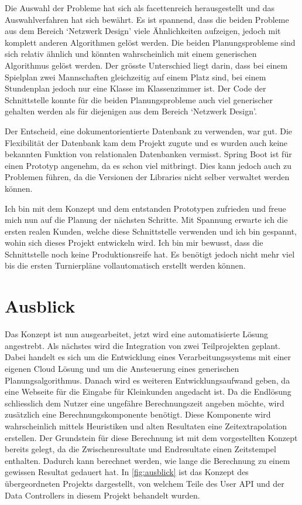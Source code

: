 Die Auswahl der Probleme hat sich als facettenreich herausgestellt und das Auswahlverfahren hat sich bewährt. Es ist spannend, dass die beiden Probleme aus dem Bereich `Netzwerk Design' 
viele Ähnlichkeiten aufzeigen, jedoch mit komplett anderen Algorithmen gelöst werden. Die beiden Planungsprobleme sind sich relativ ähnlich und könnten wahrscheinlich mit einem generischen 
Algorithmus gelöst werden. Der grösste Unterschied liegt darin, dass bei einem Spielplan zwei Mannschaften gleichzeitig auf einem Platz sind, bei einem 
Stundenplan jedoch nur eine Klasse im Klassenzimmer ist. Der Code der Schnittstelle konnte für die beiden Planungsprobleme auch viel generischer gehalten werden als für diejenigen aus dem Bereich 
`Netzwerk Design'.

Der Entscheid, eine dokumentorientierte Datenbank zu verwenden, war gut. Die Flexibilität der Datenbank kam dem Projekt zugute und es wurden auch keine bekannten Funktion von relationalen 
Datenbanken vermisst. Spring Boot ist für einen Prototyp angenehm, da es schon viel mitbringt. Dies kann jedoch auch zu Problemen führen, da die Versionen der Libraries nicht selber verwaltet 
werden können. 

Ich bin mit dem Konzept und dem entstanden Prototypen zufrieden und freue mich nun auf die Planung der nächsten Schritte. Mit Spannung erwarte ich die ersten realen Kunden, welche diese 
Schnittstelle verwenden und ich bin gespannt, wohin sich dieses Projekt entwickeln wird. Ich bin mir bewusst, dass die Schnittstelle noch keine Produktionsreife hat. Es benötigt jedoch nicht mehr viel bis die 
ersten Turnierpläne vollautomatisch erstellt werden können.

\section{Ausblick}\label{fazit_ausblick}

Das Konzept ist nun ausgearbeitet, jetzt wird eine automatisierte Lösung angestrebt. Als nächstes wird die Integration von zwei Teilprojekten geplant. Dabei handelt es sich um die Entwicklung eines 
Verarbeitungssystems mit einer eigenen Cloud Lösung und um die Ansteuerung eines generischen Planungsalgorithmus. Danach wird es weiteren Entwicklungsaufwand geben, da eine 
Webseite für die Eingabe für Kleinkunden angedacht ist. Da die Endlösung schliesslich dem Nutzer eine ungefähre Berechnungszeit angeben möchte, wird zusätzlich eine Berechnungskomponente 
benötigt. Diese Komponente wird wahrscheinlich mittels Heuristiken und alten Resultaten eine Zeitextrapolation erstellen. Der Grundstein für diese Berechnung ist mit dem vorgestellten Konzept 
bereits gelegt, da die Zwischenresultate und Endresultate einen Zeitstempel enthalten. Dadurch kann berechnet werden, wie lange die Berechnung zu einem gewissen Resultat gedauert hat. In 
\autoref{fig:ausblick} ist das Konzept des übergeordneten Projekts dargestellt, von welchem Teile des User API und der Data Controllers in diesem Projekt behandelt wurden.

